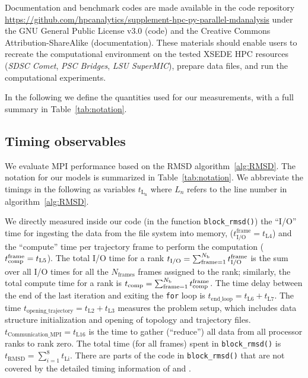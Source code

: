\label{sec:methods}

Documentation and benchmark codes are made available in the code repository \url{https://github.com/hpcanalytics/supplement-hpc-py-parallel-mdanalysis} under the GNU General Public License v3.0 (code) and the Creative Commons Attribution-ShareAlike (documentation). 
These materials should enable users to recreate the computational environment on the tested XSEDE HPC resources (\emph{SDSC Comet}, \emph{PSC Bridges}, \emph{LSU SuperMIC}), prepare data files, and run the computational experiments.

In the following we define the quantities used for our measurements, with a full summary in Table~\ref{tab:notation}.


\subsection{Timing observables}
We evaluate MPI performance based on the RMSD algorithm~\ref{alg:RMSD}. 
The notation for our models is summarized in Table~\ref{tab:notation}.
We abbreviate the timings in the following as variables $t_{\text{L}_{\text{n}}}$ where $L_{n}$ refers to the line number in algorithm~\ref{alg:RMSD}.

We directly measured inside our code (in the function \texttt{block\_rmsd()}) the ``I/O'' time for
ingesting the data from the file system into memory, ($t_{\text{I/O}}^{\text{frame}} = t_{\text{L4}}$) and the ``compute'' time per
trajectory frame to perform the computation (${t}_{\text{comp}}^{\text{frame}} = t_{\text{L5}}$).
The total I/O time for a rank  ${t}_{\text{I/O}} = \sum_{\text{frame}=1}^{N_{\text{b}}} {t}_{\text{I/O}}^{\text{frame}}$ is the sum over all I/O times for all the $N_{\text{frames}}$ frames assigned to the rank; similarly, the total compute time for a rank is ${t}_{\text{comp}} = \sum_{\text{frame}=1}^{N_{\text{b}}} {t}_{\text{comp}}^{\text{frame}}$. 
The time delay between the end of the last iteration and exiting the \texttt{for} loop is $t_{\text{end\_loop}} = t_{\text{L6}}+t_{\text{L7}}$.
The time $t_{\text{opening\_trajectory}} = t_{\text{L2}}+t_{\text{L3}}$ measures the problem setup, which includes data structure initialization and opening of topology and trajectory files.
$t_{\text{Communication\_{MPI}}} = t_{\text{L16}}$ is the time to gather (``reduce'') all data from all processor ranks to rank zero.
The total time (for all frames) spent in \texttt{block\_rmsd()} is $t_{\text{RMSD}} = \sum_{i=1}^{8}t_{\text{Li}}$. 
There are parts of the code in \texttt{block\_rmsd()} that are not covered by the detailed timing information of \tcomp and \tIO.

